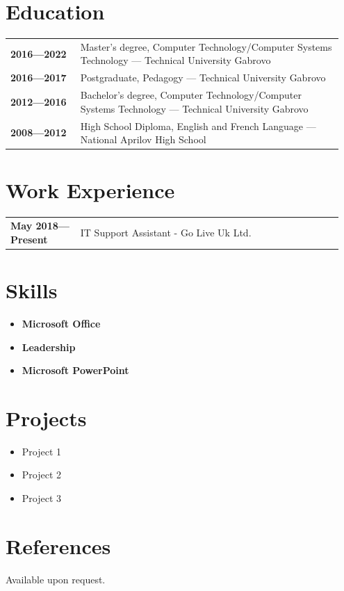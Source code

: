 \documentclass[letterpaper,10pt]{article}
\begin{document}
	\hfill
	\begin{minipage}[t]{0.5\textwidth}
		\section*{Education}
		\begin{tabular}{@{}p{0.2\linewidth} p{0.75\linewidth}}
			\textbf{2016—2022} & Master's degree, Computer Technology/Computer Systems
			Technology — Technical University Gabrovo \\
			\textbf{2016—2017} & Postgraduate, Pedagogy — Technical University Gabrovo \\
			\textbf{2012—2016} & Bachelor's degree, Computer Technology/Computer Systems
			Technology — Technical University Gabrovo \\
			\textbf{2008—2012} & High School Diploma, English and French Language — National Aprilov High School \\
		\end{tabular}
		
		\section*{Work Experience}
		\begin{tabular}{@{}p{0.2\linewidth} p{0.75\linewidth}}
			\textbf{May 2018—Present} & IT Support Assistant - Go Live Uk Ltd. \\
			
		\end{tabular}
		
		\section*{Skills}
		\begin{itemize}
			\item \textbf{Microsoft Office}
			\item \textbf{Leadership}
			\item \textbf{Microsoft PowerPoint}
		\end{itemize}
		
		\section*{Projects}
		\begin{itemize}
			\item Project 1
			\item Project 2
			\item Project 3
		\end{itemize}
		
		\section*{References}
		Available upon request.
	\end{minipage}
	
\end{document}
